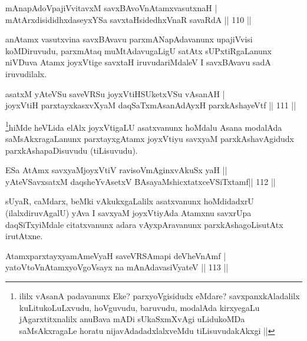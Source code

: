 
\begin{shl}
mAnapAdoVpajiVvitavxM savxBAvoV\s nAtamxvasutxnaH | \\
mAtArxdisididhxdaseyxYSa savxtaHsidedhxVnaR savaRdA \hfill||  110 ||  
\end{shl}

\begin{artha}
anAtamx vasutxvina savxBAvavu parxmANapAdavanunx upajiVvisi koMDiruvudu, parxmAtaq muMtAdavugaLigU satAtx sUPxtiRgaLanunx niVDuva Atamx joyxVtige savxtaH iruvudariMdaleV I savxBAvavu sadA iruvudilalx.
\end{artha}


\begin{shl}
asatxM yAteVSu saveVRSu joyxVtiHSUketxVSu vAsanAH | \\
joyxVtiH parxtayxkasxvXyaM daqSaTxmAsanAdAyxH parxkAshayeVtf \hfill||  111 ||  
\end{shl}

\begin{artha}
\footnote{ililx vAsanA padavanunx Eke? parxyoVgisidudx eMdare? savxpanxkAladalilx kuLitukoLuLxvudu, hoVguvudu, baruvudu, modalAda kirxyegaLu jAgarxtitxnalilx anuBava mADi sUkaSxmXvAgi uLidukoMDa saMsAkxragaLe horatu nijavAdadadxlalxveMdu tiLisuvudakAkxgi ||}hiMde heVLida elAlx joyxVtigaLU asatxvanunx hoMdalu Asana modalAda saMsAkxragaLanunx parxtayxgAtamx joyxVtiyu savxyaM parxkAshavAgidudx parxkAshapaDisuvudu (tiLisuvudu).
\end{artha}

\begin{shl}
ESa AtAmx savxyaMjoyxVtiV ravisoVmAginxvAkuSx yaH ||  \\
yAteVSavxsatxM daqsheYvA\s \s setxV BAsayaMshicxtatxceVSiTxtamf\hfill ||  112 ||  
\end{shl}

\begin{artha}
sUyaR, caMdarx, beMki vAkukxgaLalilx asatxvanunx hoMdidadxrU (ilalxdiruvAgalU) yAva I savxyaM joyxVtiyAda Atamxnu savxrUpa daqSiTxyiMdale citatxvanunx adara vAyxpAravanunx parxkAshagoLisutAtx irutAtxne.
\end{artha}

\begin{shl}
AtamxparxtayxyamAmeVyaH saveVRSAmapi deVheVnAmf | \\
yatoV\s toV\s nAtamxyoVgoV\s sayx na mAnAdavasiVyateV \hfill||  113 ||  
\end{shl}

